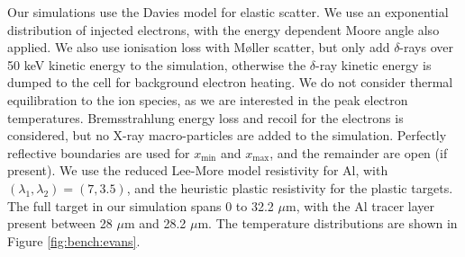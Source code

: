 \documentclass[12pt]{article}
\numberwithin{equation}{section}
\begin{document}
Our simulations use the Davies model for elastic scatter. We use an exponential distribution of injected electrons, with the energy dependent Moore angle also applied. We also use ionisation loss with M\o{}ller scatter, but only add $\delta$-rays over 50 keV kinetic energy to the simulation, otherwise the $\delta$-ray kinetic energy is dumped to the cell for background electron heating. We do not consider thermal equilibration to the ion species, as we are interested in the peak electron temperatures. Bremsstrahlung energy loss and recoil for the electrons is considered, but no X-ray macro-particles are added to the simulation. Perfectly reflective boundaries are used for $x_\text{min}$ and $x_\text{max}$, and the remainder are open (if present). We use the reduced Lee-More model resistivity for Al, with $(\lambda_1,\lambda_2)=(7,3.5)$, and the heuristic plastic resistivity for the plastic targets. The full target in our simulation spans 0 to 32.2 $\mu$m, with the Al tracer layer present between 28 $\mu$m and 28.2 $\mu$m. The temperature distributions are shown in Figure \ref{fig:bench:evans}.
\end{document}
